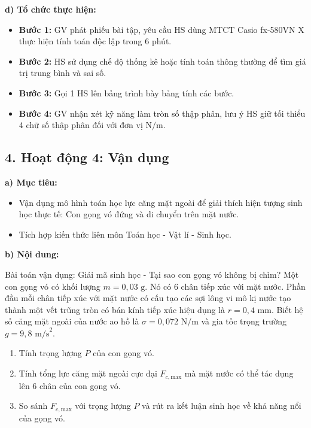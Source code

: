 \documentclass[12pt, a4paper]{article}
\begin{document}
\noindent \textbf{d) Tổ chức thực hiện:}
\begin{itemize}
    \item \textbf{Bước 1:} GV phát phiếu bài tập, yêu cầu HS dùng MTCT Casio fx-580VN X thực hiện tính toán độc lập trong 6 phút.
    \item \textbf{Bước 2:} HS sử dụng chế độ thống kê hoặc tính toán thông thường để tìm giá trị trung bình và sai số.
    \item \textbf{Bước 3:} Gọi 1 HS lên bảng trình bày bảng tính các bước.
    \item \textbf{Bước 4:} GV nhận xét kỹ năng làm tròn số thập phân, lưu ý HS giữ tối thiểu 4 chữ số thập phân đối với đơn vị $\text{N/m}$.
\end{itemize}

\subsection*{4. Hoạt động 4: Vận dụng}

\noindent \textbf{a) Mục tiêu:}
\begin{itemize}
    \item Vận dụng mô hình toán học lực căng mặt ngoài để giải thích hiện tượng sinh học thực tế: Con gọng vó đứng và di chuyển trên mặt nước.
    \item Tích hợp kiến thức liên môn Toán học - Vật lí - Sinh học.
\end{itemize}

\noindent \textbf{b) Nội dung:}
\begin{pedabox}{Bài toán vận dụng: Giải mã sinh học - Tại sao con gọng vó không bị chìm?}
    Một con gọng vó có khối lượng $m = 0{,}03\text{ g}$. Nó có 6 chân tiếp xúc với mặt nước. Phần đầu mỗi chân tiếp xúc với mặt nước có cấu tạo các sợi lông vi mô kị nước tạo thành một vết trũng tròn có bán kính tiếp xúc hiệu dụng là $r = 0{,}4\text{ mm}$.
    Biết hệ số căng mặt ngoài của nước ao hồ là $\sigma = 0{,}072\text{ N/m}$ và gia tốc trọng trường $g = 9{,}8\text{ m/s}^2$.
    \begin{enumerate}
        \item Tính trọng lượng $P$ của con gọng vó.
        \item Tính tổng lực căng mặt ngoài cực đại $F_{c,\text{max}}$ mà mặt nước có thể tác dụng lên 6 chân của con gọng vó.
        \item So sánh $F_{c,\text{max}}$ với trọng lượng $P$ và rút ra kết luận sinh học về khả năng nổi của gọng vó.
    \end{enumerate}
\end{pedabox}
\end{document}
